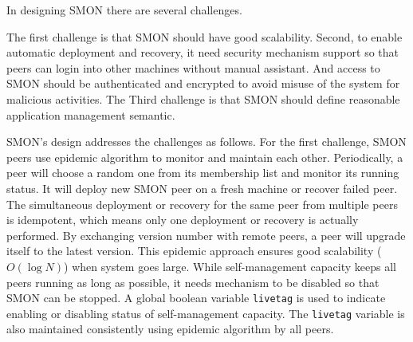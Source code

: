 


In designing SMON there are several challenges.

The first challenge is that SMON should have good
scalability. Second, to enable automatic deployment and
recovery, it need security mechanism support so that peers
can login into other machines without manual assistant. And
access to SMON should be authenticated and encrypted to
avoid misuse of the system for malicious activities. The
Third challenge is that SMON should define reasonable
application management semantic.

SMON's design addresses the challenges as follows. For the
first challenge, SMON peers use epidemic algorithm to
monitor and maintain each other. Periodically, a peer will
choose a random one from its membership list and monitor its
running status. It will deploy new SMON peer on a fresh
machine or recover failed peer. The simultaneous deployment
or recovery for the same peer from multiple peers is
idempotent, which means only one deployment or recovery is
actually performed. By exchanging version number with remote
peers, a peer will upgrade itself to the latest version.
This epidemic approach ensures good scalability ($O(\log
N)$) when system goes large. While self-management capacity
keeps all peers running as long as possible, it needs
mechanism to be disabled so that SMON can be stopped. A
global boolean variable \texttt{livetag} is used to indicate
enabling or disabling status of self-management capacity. The
\texttt{livetag} variable is also maintained consistently
using epidemic algorithm by all peers.

